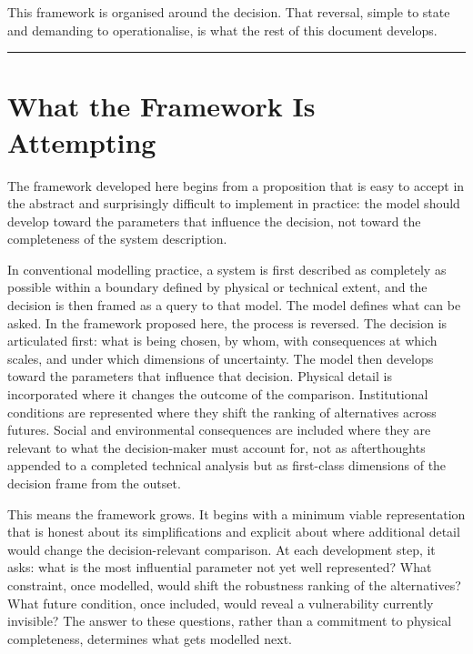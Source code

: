 \documentclass[
  11pt,
  a4paper,
  twoside,
  openright]{scrbook}
\begin{document}
This framework is organised around the decision. That reversal, simple
to state and demanding to operationalise, is what the rest of this
document develops.

\begin{center}\rule{0.5\linewidth}{0.5pt}\end{center}

\section{What the Framework Is
Attempting}\label{what-the-framework-is-attempting}

The framework developed here begins from a proposition that is easy to
accept in the abstract and surprisingly difficult to implement in
practice: the model should develop toward the parameters that influence
the decision, not toward the completeness of the system description.

In conventional modelling practice, a system is first described as
completely as possible within a boundary defined by physical or
technical extent, and the decision is then framed as a query to that
model. The model defines what can be asked. In the framework proposed
here, the process is reversed. The decision is articulated first: what
is being chosen, by whom, with consequences at which scales, and under
which dimensions of uncertainty. The model then develops toward the
parameters that influence that decision. Physical detail is incorporated
where it changes the outcome of the comparison. Institutional conditions
are represented where they shift the ranking of alternatives across
futures. Social and environmental consequences are included where they
are relevant to what the decision-maker must account for, not as
afterthoughts appended to a completed technical analysis but as
first-class dimensions of the decision frame from the outset.

This means the framework grows. It begins with a minimum viable
representation that is honest about its simplifications and explicit
about where additional detail would change the decision-relevant
comparison. At each development step, it asks: what is the most
influential parameter not yet well represented? What constraint, once
modelled, would shift the robustness ranking of the alternatives? What
future condition, once included, would reveal a vulnerability currently
invisible? The answer to these questions, rather than a commitment to
physical completeness, determines what gets modelled next.
\end{document}
